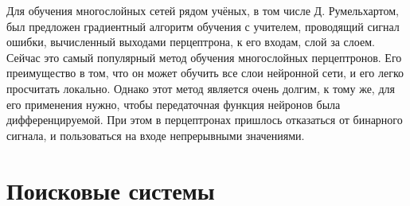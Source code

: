 Для обучения многослойных сетей рядом учёных, в том числе Д. Румельхартом, был предложен градиентный алгоритм обучения с учителем, проводящий сигнал ошибки, вычисленный выходами перцептрона, к его входам, слой за слоем. Сейчас это самый популярный метод обучения многослойных перцептронов. Его преимущество в том, что он может обучить все слои нейронной сети, и его легко просчитать локально. Однако этот метод является очень долгим, к тому же, для его применения нужно, чтобы передаточная функция нейронов была дифференцируемой. При этом в перцептронах пришлось отказаться от бинарного сигнала, и пользоваться на входе непрерывными значениями.


\section{Поисковые системы}


